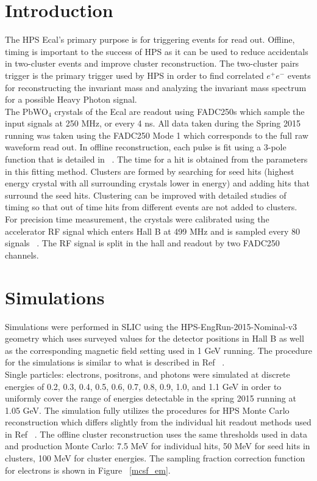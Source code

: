 \documentclass[twoside]{article}
\begin{document}
\begin{multicols}{2} %

\section{Introduction}

The HPS Ecal's primary purpose is for triggering events for read out. Offline, timing is important to the success of HPS as it can be used to reduce accidentals in two-cluster events and improve cluster reconstruction. The two-cluster pairs trigger is the primary trigger used by HPS in order to find correlated $e^+e^-$ events for reconstructing the invariant mass and analyzing the invariant mass spectrum for a possible Heavy Photon signal.\\ 
\indent The PbWO$_4$ crystals of the Ecal are readout using FADC250s which sample the input signals at 250 MHz, or every 4 ns. All data taken during the Spring 2015 running was taken using the FADC250 Mode 1 which corresponds to the full raw waveform read out. In offline reconstruction, each pulse is fit using a 3-pole function that is detailed in ~\cite{Baltzell}. The time for a hit is obtained from the parameters in this fitting method. Clusters are formed by searching for seed hits (highest energy crystal with all surrounding crystals lower in energy) and adding hits that surround the seed hits. Clustering can be improved with detailed studies of timing so that out of time hits from different events are not added to clusters. 
\indent For precision time measurement, the crystals were calibrated using the accelerator RF signal which enters Hall B at 499 MHz and is sampled every 80 signals ~\cite{Kazimi}. The RF signal is  split in the hall and readout by two FADC250 channels.

\section{Simulations}

Simulations were performed in SLIC using the HPS-EngRun-2015-Nominal-v3 geometry which uses surveyed values for the detector positions in Hall B as well as the corresponding magnetic field setting used in 1 GeV running. The procedure for the simulations is similar to what is described in Ref ~\cite{Garcon}.\\
\indent Single particles: electrons, positrons, and photons were simulated at discrete energies of 0.2, 0.3, 0.4, 0.5, 0.6, 0.7, 0.8, 0.9, 1.0, and 1.1 GeV in order to uniformly cover the range of energies detectable in the spring 2015 running at 1.05 GeV. The simulation fully utilizes the procedures for HPS Monte Carlo reconstruction which differs slightly from the individual hit readout methods used in Ref ~\cite{Garcon}. The offline cluster reconstruction uses the same thresholds used in data and production Monte Carlo: 7.5 MeV for individual hits, 50 MeV for seed hits in clusters, 100 MeV for cluster energies. The sampling fraction correction function for electrons is shown in Figure ~\ref{mcsf_em}.  


\end{multicols}
\end{document}
